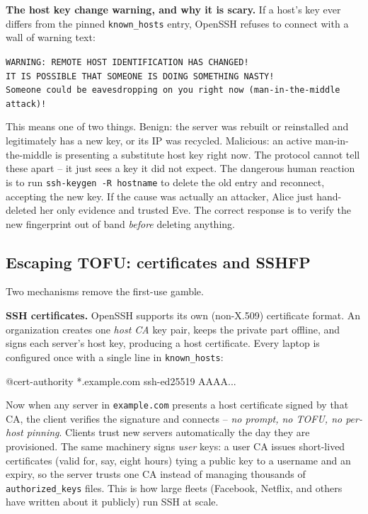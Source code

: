 \begin{attackbox}
\textbf{The host key change warning, and why it is scary.} If a host's key ever differs from the pinned \texttt{known\_hosts} entry, OpenSSH refuses to connect with a wall of warning text:
\begin{center}
\texttt{WARNING: REMOTE HOST IDENTIFICATION HAS CHANGED!}\\
\texttt{IT IS POSSIBLE THAT SOMEONE IS DOING SOMETHING NASTY!}\\
\texttt{Someone could be eavesdropping on you right now (man-in-the-middle attack)!}
\end{center}
This means one of two things. Benign: the server was rebuilt or reinstalled and legitimately has a new key, or its IP was recycled. Malicious: an active man-in-the-middle is presenting a substitute host key right now. The protocol cannot tell these apart -- it just sees a key it did not expect. The dangerous human reaction is to run \texttt{ssh-keygen -R hostname} to delete the old entry and reconnect, accepting the new key. If the cause was actually an attacker, Alice just hand-deleted her only evidence and trusted Eve. The correct response is to verify the new fingerprint out of band \emph{before} deleting anything.
\end{attackbox}

\subsection{Escaping TOFU: certificates and SSHFP}

Two mechanisms remove the first-use gamble.

\textbf{SSH certificates.} OpenSSH supports its own (non-X.509) certificate format. An organization creates one \emph{host CA} key pair, keeps the private part offline, and signs each server's host key, producing a host certificate. Every laptop is configured once with a single line in \texttt{known\_hosts}:

\begin{center}\ttfamily @cert-authority *.example.com ssh-ed25519 AAAA...\end{center}

Now when any server in \texttt{example.com} presents a host certificate signed by that CA, the client verifies the signature and connects -- \emph{no prompt, no TOFU, no per-host pinning}. Clients trust new servers automatically the day they are provisioned. The same machinery signs \emph{user} keys: a user CA issues short-lived certificates (valid for, say, eight hours) tying a public key to a username and an expiry, so the server trusts one CA instead of managing thousands of \texttt{authorized\_keys} files. This is how large fleets (Facebook, Netflix, and others have written about it publicly) run SSH at scale.

